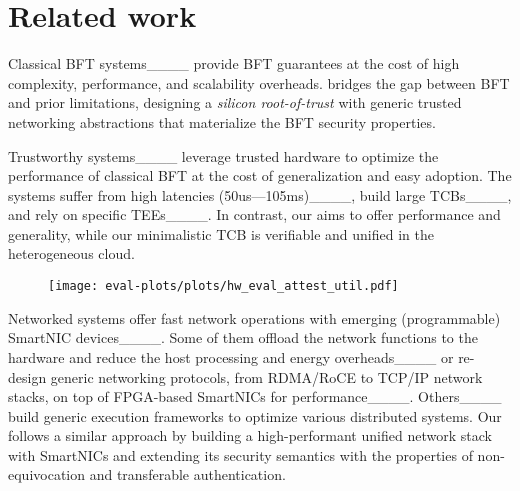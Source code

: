\section{Related work}

 Classical BFT systems____ provide BFT guarantees at the cost of high complexity, performance, and scalability overheads. \projecttitle{} bridges the gap between BFT and prior limitations, designing a {\em silicon root-of-trust} with generic trusted networking abstractions that materialize the BFT security properties.

 Trustworthy systems____ leverage trusted hardware to optimize the performance of classical BFT at the cost of generalization and easy adoption. The systems suffer from high latencies (50us---105ms)____, build large TCBs____, and rely on specific TEEs____. In contrast, our \projecttitle{} aims to offer performance and generality, while our minimalistic TCB is verifiable and unified in the heterogeneous cloud. 

\begin{figure}
    \centering
    \texttt{[image: eval-plots/plots/hw\_eval\_attest\_util.pdf]}
    \vspace{-10pt}
  \caption{ }
    \label{fig:scalability}
\end{figure}

 Networked systems offer fast network operations with emerging (programmable) SmartNIC devices____. Some of them offload the network functions to the hardware and reduce the host processing and energy overheads____ or re-design generic networking protocols, from RDMA/RoCE to TCP/IP network stacks, on top of FPGA-based SmartNICs for performance____. Others____ build generic execution frameworks to optimize various distributed systems. Our \projecttitle{} follows a similar approach by building a high-performant unified network stack with SmartNICs and extending its security semantics with the properties of non-equivocation and transferable authentication.%


